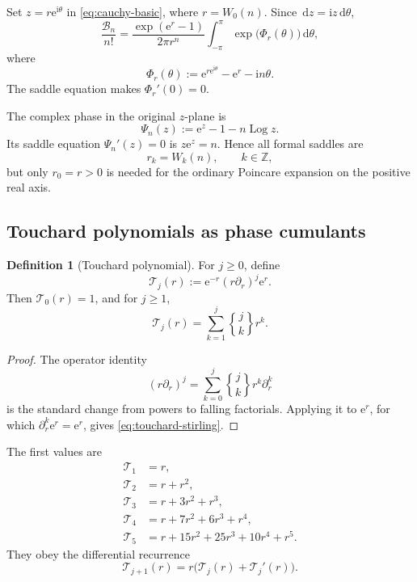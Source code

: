 \documentclass[11pt,a4paper]{article}
\theoremstyle{definition}
\newtheorem{definition}[theorem]{Definition}
\theoremstyle{remark}
\newcommand{\Bell}{\mathcal B}
\newcommand{\Tch}{\mathscr T}
\newcommand{\ii}{\mathrm i}
\newcommand{\ee}{\mathrm e}
\newcommand{\dd}{\,\mathrm d}
\newcommand{\Stwo}[2]{\genfrac\{\}{0pt}{}{#1}{#2}}
\DeclareMathOperator{\Log}{Log}
\begin{document}
Set \(z=r\ee^{\ii\theta}\) in \cref{eq:cauchy-basic}, where
\(r=W_0(n)\).  Since \(\dd z=\ii z\dd\theta\),
\begin{equation}\label{eq:circular-integral}
 \frac{\Bell_n}{n!}
 =\frac{\exp(\ee^r-1)}{2\pi r^n}
  \int_{-\pi}^{\pi}\exp\!\bigl(\Phi_r(\theta)\bigr)\dd\theta,
\end{equation}
where
\begin{equation}\label{eq:phase}
 \Phi_r(\theta)
 :=\ee^{r\ee^{\ii\theta}}-\ee^r-\ii n\theta.
\end{equation}
The saddle equation makes \(\Phi_r'(0)=0\).

The complex phase in the original \(z\)-plane is
\begin{equation}\label{eq:zphase}
 \Psi_n(z):=\ee^z-1-n\Log z.
\end{equation}
Its saddle equation \(\Psi_n'(z)=0\) is \(z\ee^z=n\).  Hence all formal saddles
are
\[
 r_k=W_k(n),\qquad k\in\mathbb Z,
\]
but only \(r_0=r>0\) is needed for the ordinary Poincare expansion on the
positive real axis.

\subsection{Touchard polynomials as phase cumulants}

\begin{definition}[Touchard polynomial]\label{def:touchard}
For \(j\ge0\), define
\begin{equation}\label{eq:touchard-def}
 \Tch_j(r):=\ee^{-r}(r\partial_r)^j\ee^r.
\end{equation}
Then \(\Tch_0(r)=1\), and for \(j\ge1\),
\begin{equation}\label{eq:touchard-stirling}
 \Tch_j(r)=\sum_{k=1}^j\Stwo{j}{k}r^k.
\end{equation}
\end{definition}

\begin{proof}
The operator identity
\[
 (r\partial_r)^j=\sum_{k=0}^j\Stwo{j}{k}r^k\partial_r^k
\]
is the standard change from powers to falling factorials.  Applying it to
\(\ee^r\), for which \(\partial_r^k\ee^r=\ee^r\), gives
\cref{eq:touchard-stirling}.
\end{proof}

The first values are
\begin{align*}
 \Tch_1&=r,\\
 \Tch_2&=r+r^2,\\
 \Tch_3&=r+3r^2+r^3,\\
 \Tch_4&=r+7r^2+6r^3+r^4,\\
 \Tch_5&=r+15r^2+25r^3+10r^4+r^5.
\end{align*}
They obey the differential recurrence
\begin{equation}\label{eq:touchard-recurrence}
 \Tch_{j+1}(r)=r\bigl(\Tch_j(r)+\Tch_j'(r)\bigr).
\end{equation}
\end{document}
